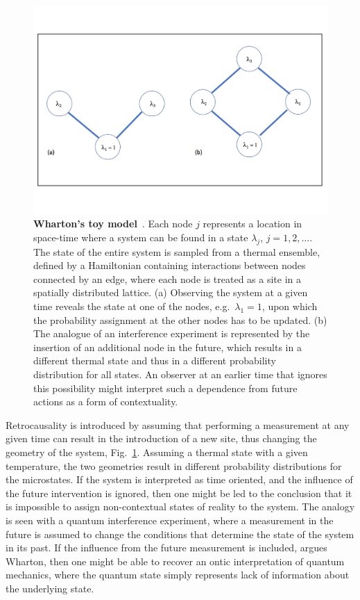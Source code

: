 \documentclass[a4paper,onecolumn,11pt,accepted=2018-05-04]{quantumarticle}
\begin{document}
\begin{figure}[ht]%
\includegraphics[width=0.8\columnwidth]{WhartonFig.pdf}%
\caption{\textbf{Wharton's toy model}~\cite{Wharton2014}. Each node $j$ represents a location in space-time where a system can be found in a state $\lambda_j$, $j=1,2,\dots$. The state of the entire system is sampled from a thermal ensemble, defined by a Hamiltonian containing interactions between nodes connected by an edge, where each node is treated as a site in a spatially distributed lattice. (a) Observing the system at a given time reveals the state at one of the nodes, e.g.\ $\lambda_1=1$, upon which the probability assignment at the other nodes has to be updated. (b) The analogue of an interference experiment is represented by the insertion of an additional node in the future, which results in a different thermal state and thus in a different probability distribution for all states. An observer at an earlier time that ignores this possibility might interpret such a dependence from future actions as a form of contextuality.}%
\label{spins}%
\end{figure}

Retrocausality is introduced by assuming that performing a measurement at any given time can result in the introduction of a new site, thus changing the geometry of the system, Fig.~\ref{spins}. Assuming a thermal state with a given temperature, the two geometries result in different probability distributions for the microstates. If the system is interpreted as time oriented, and the influence of the future intervention is ignored, then one might be led to the conclusion that it is impossible to assign non-contextual states of reality to the system. The analogy is seen with a quantum interference experiment, where a measurement in the future is assumed to change the conditions that determine the state of the system in its past. If the influence from the future measurement is included, argues Wharton, then one might be able to recover an ontic interpretation of quantum mechanics, where the quantum state simply represents lack of information about the underlying state.
\end{document}
